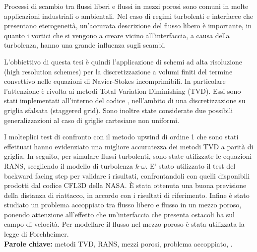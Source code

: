 Processi di scambio tra flussi liberi e flussi in mezzi porosi sono comuni in 
molte applicazioni industriali o ambientali. Nel caso di regimi turbolenti e 
interfacce che presentano eterogeneità, un'accurata descrizione del flusso 
libero è importante, in quanto i vortici che si vengono a creare vicino 
all'interfaccia, a causa della turbolenza, hanno una grande influenza sugli 
scambi.

L'obbiettivo di questa tesi è quindi l'applicazione di schemi ad alta 
risoluzione 
(high resolution schemes)
per la discretizzazione a volumi finiti del termine convettivo nelle equazioni 
di Navier-Stokes incomprimibili. In particolare l'attenzione è rivolta ai 
metodi Total Variation Diminishing (TVD). Essi sono stati implementati 
all'interno del codice \DUMUX, nell'ambito di una discretizzazione su griglia 
sfalsata (staggered grid). Sono inoltre state considerate due possibili 
generalizzazioni al caso di griglie cartesiane non 
uniformi.

I molteplici test di confronto con il metodo upwind di ordine 1 che sono stati 
effettuati hanno evidenziato una migliore accuratezza dei metodi TVD a parità 
di griglia. 
In seguito, per simulare flussi turbolenti, sono state utilizzate le equazioni 
RANS, scegliendo il modello di turbolenza $k\text{-}\omega$. E' stato 
utilizzato il test del backward facing step per validare i risultati, 
confrontandoli con quelli disponibili prodotti dal codice CFL3D della NASA. È 
stata ottenuta una buona previsione della distanza di riattacco, in accordo con 
i risultati di riferimento. Infine è stato studiato un problema accoppiato tra 
flusso libero e flusso in un mezzo poroso, ponendo attenzione all'effetto che 
un'interfaccia che presenta ostacoli ha sul campo di velocità. Per modellare il 
flusso nel mezzo poroso è stata utilizzata la legge di Forchheimer.
\\[\baselineskip]
\textbf{Parole chiave:} metodi TVD, RANS, mezzi porosi, problema accoppiato, 
\DUMUX.